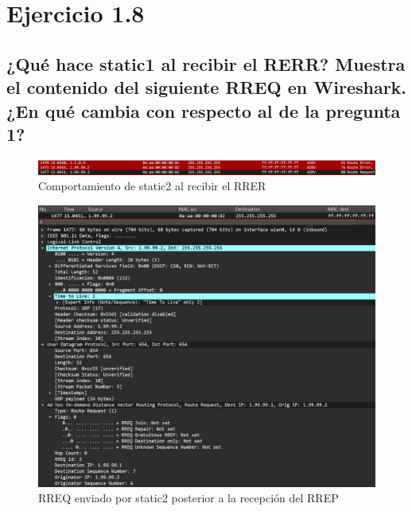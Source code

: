 \vspace{1.25cm}
\section{Ejercicio 1.8}

\subsection{¿Qué hace static1 al recibir el RERR? Muestra el contenido del siguiente RREQ en Wireshark. ¿En qué cambia
con respecto al de la pregunta 1?}

\begin{figure}[H]
    \centering
    \includegraphics[width=125mm, scale=0.75]{imaxes/ejercicio8_1.png}
    \caption{Comportamiento de static2 al recibir el RRER}
    \label{fig:ComportamientoStatic2}
\end{figure}

\begin{figure}[H]
    \centering
    \includegraphics[width=125mm, scale=0.75]{imaxes/ejercicio8_2.png}
    \caption{RREQ enviado por static2 posterior a la recepción del RREP}
    \label{fig:RREQstatic2}
\end{figure}